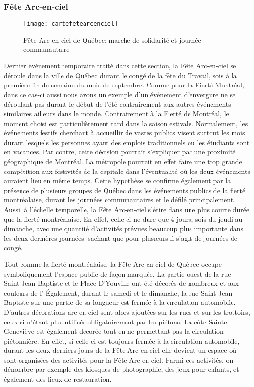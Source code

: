\subsubsection{Fête Arc-en-ciel}
\label{subsec:fetearcenciel}

\begin{figure}[h!]
  \centering
  \texttt{[image: cartefetearcenciel]}
  \caption[Fête Arc-en-ciel de Québec]{Fête Arc-en-ciel de Québec: marche de solidarité et journée communautaire}\label{fig:cartefetearcenciel}
\end{figure}

Dernier événement temporaire traité dans cette section, la Fête Arc-en-ciel se déroule dans la ville de Québec durant le congé de la fête du Travail, sois à la première fin de semaine du mois de septembre.
Comme pour la Fierté Montréal, dans ce cas-ci aussi nous avons un exemple d'un événement d'envergure ne se déroulant pas durant le début de l'été contrairement aux autres événements similaires ailleurs dans le monde.
Contrairement à la Fierté de Montréal, le moment choisi est particulièrement tard dans la saison estivale.
Normalement, les événements festifs cherchant à accueillir de vastes publics visent surtout les mois durant lesquels les personnes ayant des emplois traditionnels ou les étudiants sont en vacances.
Par contre, cette décision pourrait s'expliquer par une proximité géographique de Montréal.
La métropole pourrait en effet faire une trop grande compétition aux festivités de la capitale dans l'éventualité où les deux événements auraient lieu en même temps.
Cette hypothèse se confirme également par la présence de plusieurs groupes de Québec dans les événements publics de la fierté montréalaise, durant les journées communautaires et le défilé principalement.
Aussi, à l'échelle temporelle, la Fête Arc-en-ciel s'étire dans une plus courte durée que la fierté montréalaise.
En effet, celle-ci ne dure que 4 jours, sois du jeudi au dimanche, avec une quantité d'activités prévues beaucoup plus importante dans les deux dernières journées, sachant que pour plusieurs il s'agit de journées de congé.

Tout comme la fierté montréalaise, la Fête Arc-en-ciel de Québec occupe symboliquement l'espace public de façon marquée.
La partie ouest de la rue Saint-Jean-Baptiste et le Place D'Youville ont été décorés de nombreux   et  aux couleurs de l'
Également, durant le samedi et le dimanche, la rue Saint-Jean-Baptiste sur une partie de sa longueur est fermée à la circulation automobile.
D'autres décorations arc-en-ciel sont alors ajoutées sur les rues et sur les trottoirs, ceux-ci n'étant plus utilisés obligatoirement par les piétons.
La côte Sainte-Geneviève est également décorée tout en ne permettant pas la circulation piétonnière.
En effet, si celle-ci est toujours fermée à la circulation automobile, durant les deux derniers jours de la Fête Arc-en-ciel elle devient un espace où sont organisées des activités pour la Fête Arc-en-ciel. Parmi ces activités, on dénombre par exemple des kiosques de photographie, des jeux pour enfants, et également des lieux de restauration.

